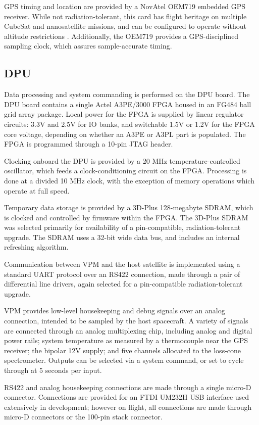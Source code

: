 GPS timing and location are provided by a NovAtel OEM719 embedded GPS receiver. While not radiation-tolerant, this card has flight heritage on multiple CubeSat and nanosatellite missions, and can be configured to operate without altitude restrictions \citep{Spangelo2013}. Additionally, the OEM719 provides a GPS-disciplined sampling clock, which assures sample-accurate timing.

\subsection{DPU}
Data processing and system commanding is performed on the DPU board. The DPU board contains a single Actel A3PE/3000 FPGA housed in an FG484 ball grid array package. Local power for the FPGA is supplied by linear regulator circuits: 3.3V and 2.5V for IO banks, and switchable 1.5V or 1.2V for the FPGA core voltage, depending on whether an A3PE or A3PL part is populated. The FPGA is programmed through a 10-pin JTAG header.

Clocking onboard the DPU is provided by a 20 MHz temperature-controlled oscillator, which feeds a clock-conditioning circuit on the FPGA. Processing is done at a divided 10 MHz clock, with the exception of memory operations which operate at full speed.

Temporary data storage is provided by a 3D-Plus 128-megabyte SDRAM, which is clocked and controlled by firmware within the FPGA. The 3D-Plus SDRAM was selected primarily for availability of a pin-compatible, radiation-tolerant upgrade. The SDRAM uses a 32-bit wide data bus, and includes an internal refreshing algorithm.

Communication between VPM and the host satellite is implemented using a standard UART protocol over an RS422 connection, made through a pair of differential line drivers, again selected for a pin-compatible radiation-tolerant upgrade. %

VPM provides low-level housekeeping and debug signals over an analog connection, intended to be sampled by the host spacecraft. A variety of signals are connected through an analog multiplexing chip, including analog and digital power rails; system temperature as measured by a thermocouple near the GPS receiver; the bipolar 12V supply; and five channels allocated to the loss-cone spectrometer. Outputs can be selected via a system command, or set to cycle through at 5 seconds per input.

RS422 and analog housekeeping connections are made through a single micro-D connector. Connections are provided for an FTDI UM232H USB interface used extensively in development; however on flight, all connections are made through micro-D connectors or the 100-pin stack connector.

